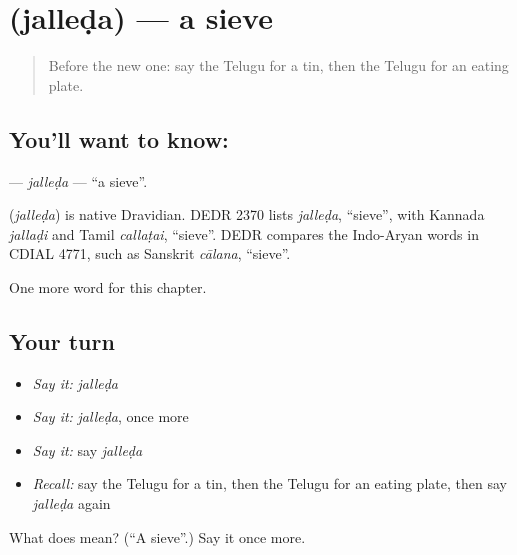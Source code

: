 \section[\texorpdfstring{\te{జల్లెడ} (jalleḍa)}{జల్లెడ (jalleḍa)}]{ (jalleḍa) — a sieve}

\label{lesson:TE-C269-jalleda}



\begin{quote}
Before the new one: say the Telugu for a tin, then the Telugu for an eating plate.
\end{quote}

\subsection*{You'll want to know: }
\textbf{} — \emph{jalleḍa} — \textquotedblleft{}a sieve\textquotedblright{}.

\begin{cousinweb}
\textbf{} (\emph{jalleḍa}) is native Dravidian. DEDR 2370 lists \emph{jalleḍa}, \textquotedblleft{}sieve\textquotedblright{}, with Kannada \emph{jallaḍi} and Tamil \emph{callaṭai}, \textquotedblleft{}sieve\textquotedblright{}. DEDR compares the Indo-Aryan words in CDIAL 4771, such as Sanskrit \emph{cālana}, \textquotedblleft{}sieve\textquotedblright{}.
\end{cousinweb}

\begin{grammarlens}[title={What you've built}]
One more word for this chapter.
\end{grammarlens}

\subsection*{Your turn}
\begin{itemize}
\raggedright
  \item \emph{Say it:} \emph{jalleḍa}
  \item \emph{Say it:} \emph{jalleḍa}, once more
  \item \emph{Say it:} say \emph{jalleḍa}
  \item \emph{Recall:} say the Telugu for a tin, then the Telugu for an eating plate, then say \emph{jalleḍa} again
\end{itemize}

\begin{tcolorbox}[breakable,colback=teal!4,colframe=teal!35!black,title={Before you move on}]
What does  mean? (\textquotedblleft{}A sieve\textquotedblright{}.) Say it once more.
\end{tcolorbox}

